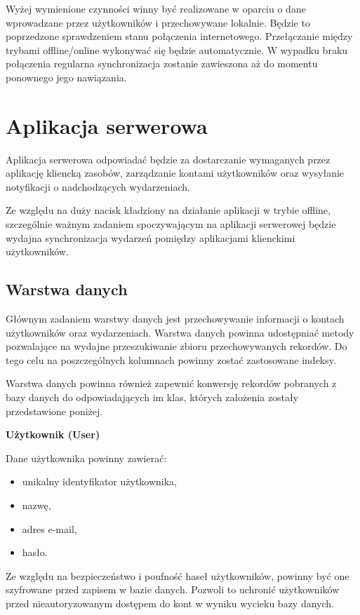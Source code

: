 Wyżej wymienione czynności winny być realizowane w oparciu o dane wprowadzane przez użytkowników i przechowywane lokalnie. Będzie to poprzedzone sprawdzeniem stanu połączenia internetowego. Przełączanie między trybami offline/online wykonywać się będzie automatycznie. W wypadku braku połączenia regularna synchronizacja zostanie zawieszona aż do momentu ponownego jego nawiązania.

\section{Aplikacja serwerowa}
\label{sec:appSerw}

Aplikacja serwerowa odpowiadać będzie za dostarczanie wymaganych przez aplikację kliencką zasobów, zarządzanie kontami użytkowników oraz wysyłanie notyfikacji o nadchodzących wydarzeniach.

Ze względu na duży nacisk kładziony na działanie aplikacji w trybie offline, szczególnie ważnym zadaniem spoczywającym na aplikacji serwerowej będzie wydajna synchronizacja wydarzeń pomiędzy aplikacjami klienckimi użytkowników.

\subsection{Warstwa danych}
\label{warstwaDanych}

Głównym zadaniem warstwy danych jest przechowywanie informacji o kontach użytkowników oraz wydarzeniach. Warstwa danych powinna udostępniać metody pozwalające na wydajne przeszukiwanie zbioru przechowywanych rekordów. Do tego celu na poszczególnych kolumnach powinny zostać zastosowane indeksy. 

Warstwa danych powinna również zapewnić konwersję rekordów pobranych z bazy danych do odpowiadających im klas, których założenia zostały przedstawione poniżej.

\textbf{Użytkownik (User)}

Dane użytkownika powinny zawierać:

\begin{itemize}
\item unikalny identyfikator użytkownika,
\item nazwę,
\item adres e-mail,
\item hasło.
\end{itemize}

Ze względu na bezpieczeństwo i poufność haseł użytkowników, powinny być one szyfrowane przed zapisem w bazie danych. Pozwoli to uchronić użytkowników przed nieautoryzowanym dostępem do kont w wyniku wycieku bazy danych.

